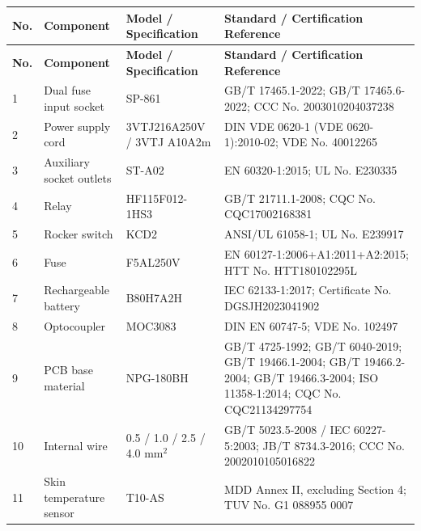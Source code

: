 \begin{longtable}{|p{}|p{}|p{}|p{}|}

\hline
\textbf{No.} &
\textbf{Component} &
\textbf{Model / Specification} &
\textbf{Standard / Certification Reference}
\\
\hline
\endfirsthead

\hline
\textbf{No.} &
\textbf{Component} &
\textbf{Model / Specification} &
\textbf{Standard / Certification Reference}
\\
\hline
\endhead

1 &
Dual fuse input socket &
SP-861 &
GB/T 17465.1-2022; GB/T 17465.6-2022;
CCC No. 2003010204037238
\\
\hline

2 &
Power supply cord &
3VTJ216A250V / 3VTJ A10A2m &
DIN VDE 0620-1 (VDE 0620-1):2010-02;
VDE No. 40012265
\\
\hline

3 &
Auxiliary socket outlets &
ST-A02 &
EN 60320-1:2015; UL No. E230335
\\
\hline

4 &
Relay &
HF115F012-1HS3 &
GB/T 21711.1-2008; CQC No. CQC17002168381
\\
\hline

5 &
Rocker switch &
KCD2 &
ANSI/UL 61058-1; UL No. E239917
\\
\hline

6 &
Fuse &
F5AL250V &
EN 60127-1:2006+A1:2011+A2:2015;
HTT No. HTT180102295L
\\
\hline

7 &
Rechargeable battery &
B80H7A2H &
IEC 62133-1:2017;
Certificate No. DGSJH2023041902
\\
\hline

8 &
Optocoupler &
MOC3083 &
DIN EN 60747-5; VDE No. 102497
\\
\hline

9 &
PCB base material &
NPG-180BH &
GB/T 4725-1992; GB/T 6040-2019;
GB/T 19466.1-2004; GB/T 19466.2-2004;
GB/T 19466.3-2004; ISO 11358-1:2014;
CQC No. CQC21134297754
\\
\hline

10 &
Internal wire &
0.5 / 1.0 / 2.5 / 4.0 mm$^2$ &
GB/T 5023.5-2008 / IEC 60227-5:2003;
JB/T 8734.3-2016; CCC No. 2002010105016822
\\
\hline

11 &
Skin temperature sensor &
T10-AS &
MDD Annex II, excluding Section 4;
TUV No. G1 088955 0007
\\
\hline


\end{longtable}
